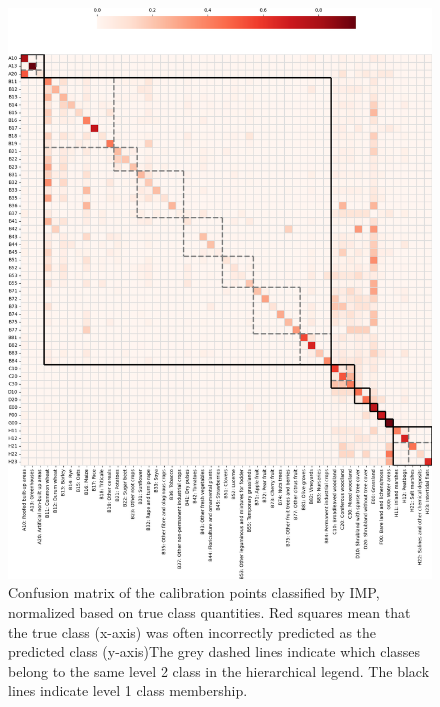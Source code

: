     \begin{figure}[H]
        \centering
        \includegraphics[width=\textwidth]{figs_05/fig_hierarchical_confusion_matrix_calib.png}
        \caption{Confusion matrix of the calibration points classified by IMP, normalized based on true class quantities. Red squares mean that the true class (x-axis) was often incorrectly predicted as the predicted class (y-axis)The grey dashed lines indicate which classes belong to the same level 2 class in the hierarchical legend. The black lines indicate level 1 class membership.}
        \label{fig:05_confusion_matrix_calib}
    \end{figure}

